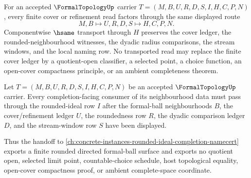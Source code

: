 \begin{theorem}
\label{thm:formal-topology-cover-stability}
For an accepted $\FormalTopologyUp$ carrier $T=(M,B,U,R,D,S,I,H,C,P,N)$, every finite cover or refinement read factors through the same displayed route
$$
M,B \longmapsto U,R,D,S \longmapsto H,C,P,N .
$$
Componentwise $\hsame$ transport through $H$ preserves the cover ledger, the rounded-neighbourhood witnesses, the dyadic radius comparisons, the stream windows, and the local naming row. No transported read may replace the finite cover ledger by a quotient-open classifier, a selected point, a choice function, an open-cover compactness principle, or an ambient completeness theorem.
\end{theorem}

\begin{theorem}
\label{thm:formal-topology-rounded-ideal-handoff}
Let $T=(M,B,U,R,D,S,I,H,C,P,N)$ be an accepted $\FormalTopologyUp$ carrier. Every completion-facing consumer of its neighbourhood data must pass through the rounded-ideal row $I$ after the formal-ball neighbourhoods $B$, the cover/refinement ledger $U$, the roundedness row $R$, the dyadic comparison ledger $D$, and the stream-window row $S$ have been displayed.

Thus the handoff to \autoref{ch:concrete-instances-rounded-ideal-completion-namecert} exports a finite rounded directed formal-ball surface and exports no quotient open, selected limit point, countable-choice schedule, host topological equality, open-cover compactness proof, or ambient complete-space coordinate.
\end{theorem}

